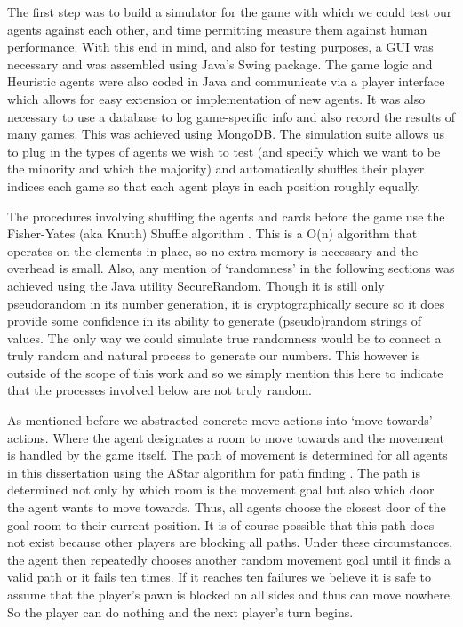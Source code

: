 \documentclass[msc, ai, twoside, notimes, logo, parskip, leftchapter, normalheadings]{infthesis}
\begin{document}
The first step was to build a simulator for the game with which we could test our agents against each other, and time permitting measure them against human performance. With this end in mind, and also for testing purposes, a GUI was necessary and was assembled using Java's Swing package. The game logic and Heuristic agents were also coded in Java and communicate via a player interface which allows for easy extension or implementation of new agents. It was also necessary to use a database to log game-specific info and also record the results of many games. This was achieved using MongoDB. The simulation suite allows us to plug in the types of agents we wish to test (and specify which we want to be the minority and which the majority) and automatically shuffles their player indices each game so that each agent plays in each position roughly equally.

The procedures involving shuffling the agents and cards before the game use the Fisher-Yates (aka Knuth) Shuffle algorithm \citep{shuffle}. This is a O(n) algorithm that operates on the elements in place, so no extra memory is necessary and the overhead is small. Also, any mention of `randomness' in the following sections was achieved using the Java utility SecureRandom. Though it is still only pseudorandom in its number generation, it is cryptographically secure so it does provide some confidence in its ability to generate (pseudo)random strings of values. The only way we could simulate true randomness would be to connect a truly random and natural process to generate our numbers. This however is outside of the scope of this work and so we simply mention this here to indicate that the processes involved below are not truly random.

As mentioned before we abstracted concrete move actions into `move-towards' actions. Where the agent designates a room to move towards and the movement is handled by the game itself. The path of movement is determined for all agents in this dissertation using the AStar algorithm for path finding \citep{Russell-norvig}. The path is determined not only by which room is the movement goal but also which door the agent wants to move towards. Thus, all agents choose the closest door of the goal room to their current position. It is of course possible that this path does not exist because other players are blocking all paths. Under these circumstances, the agent then repeatedly chooses another random movement goal until it finds a valid path or it fails ten times. If it reaches ten failures we believe it is safe to assume that the player's pawn is blocked on all sides and thus can move nowhere. So the player can do nothing and the next player's turn begins.
\end{document}
